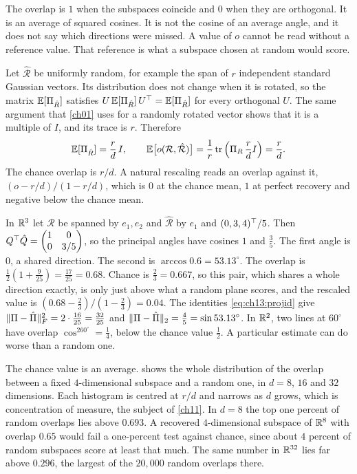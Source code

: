 The overlap is $1$ when the subspaces coincide and $0$ when they are orthogonal.
It is an average of squared cosines. It is not the cosine of an average angle,
and it does not say which directions were missed. A value of $o$ cannot be
read without a reference value. That reference is what a subspace chosen at
random would score.

Let $\hat{\mathcal R}$ be uniformly random, for example the span of $r$
independent standard Gaussian vectors. Its distribution does not change when
it is rotated, so the matrix $\mathbb{E}[\Pi_{\hat R}]$ satisfies
$U\,\mathbb{E}[\Pi_{\hat R}]\,U^{\top}=\mathbb{E}[\Pi_{\hat R}]$ for every orthogonal $U$. The same
argument that \cref{ch01} uses for a randomly rotated vector shows that it is a
multiple of $I$, and its trace is $r$. Therefore
\begin{equation}\label{eq:ch13:chance}
\mathbb{E}[\Pi_{\hat R}]=\frac rd\,I,\qquad
\mathbb{E}\big[o(\mathcal R,\hat{\mathcal R})\big]=\frac1r\operatorname{tr}\Big(\Pi_R\,\frac rd I\Big)=\frac rd .
\end{equation}
The chance overlap is $r/d$. A natural rescaling reads an overlap against it,
$(o-r/d)/(1-r/d)$, which is $0$ at the chance mean, $1$ at perfect recovery and
negative below the chance mean.

\begin{example}\label{ex:ch13:angles}
In $\mathbb{R}^3$ let $\mathcal R$ be spanned by $e_1,e_2$ and $\hat{\mathcal R}$ by $e_1$
and $(0,3,4)^{\top}/5$. Then
$Q^{\top}\hat Q=\begin{pmatrix}1&0\\0&3/5\end{pmatrix}$, so the principal angles have
cosines $1$ and $\tfrac35$. The first angle is $0$, a shared direction. The
second is $\arccos0.6=53.13^\circ$. The overlap is
$\tfrac12(1+\tfrac9{25})=\tfrac{17}{25}=0.68$. Chance is $\tfrac23=0.667$, so
this pair, which shares a whole direction exactly, is only just above what a
random plane scores, and the rescaled value is $(0.68-\tfrac23)/(1-\tfrac23)=0.04$.
The identities \cref{eq:ch13:projid} give $\lVert \Pi-\hat\Pi\rVert_F^2=2\cdot\tfrac{16}{25}=\tfrac{32}{25}$
and $\lVert \Pi-\hat\Pi\rVert_2=\tfrac45=\sin53.13^\circ$. In $\mathbb{R}^2$, two lines at
$60^\circ$ have overlap $\cos^260^\circ=\tfrac14$, below the chance value
$\tfrac12$. A particular estimate can do worse than a random one.
\end{example}

The chance value is an average.  shows the whole
distribution of the overlap between a fixed $4$-dimensional subspace and a
random one, in $d=8$, $16$ and $32$ dimensions. Each histogram is centred at
$r/d$ and narrows as $d$ grows, which is concentration of measure, the subject
of \cref{ch11}. In $d=8$ the top one percent of random overlaps lies above
$0.693$. A recovered $4$-dimensional subspace of $\mathbb{R}^8$ with overlap $0.65$
would fail a one-percent test against chance, since about $4$ percent of random
subspaces score at least that much. The same number in $\mathbb{R}^{32}$ lies far above
$0.296$, the largest of the $20{,}000$ random overlaps there.

